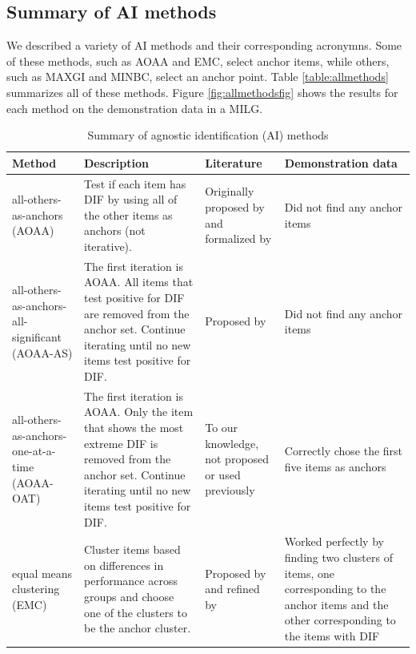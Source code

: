 \documentclass[
  11pt,
]{article}
\begin{document}
\hypertarget{summary-of-ai-methods}{%
\subsection{Summary of AI methods}\label{summary-of-ai-methods}}

We described a variety of AI methods and their corresponding acronymns. Some of these methods, such as AOAA and EMC, select anchor items, while others, such as MAXGI and MINBC, select an anchor point. Table \ref{table:allmethods} summarizes all of these methods. Figure \ref{fig:allmethodsfig} shows the results for each method on the demonstration data in a MILG.

\begin{table}[H]
\caption{Summary of agnostic identification (AI) methods}
\centering
\begin{tabular}{|p{3cm}|p{4cm}|p{3cm}|p{3cm}|}
\toprule

Method & Description & Literature & Demonstration data \\

\midrule

all-others-as-anchors (AOAA) & Test if each item has DIF by using all of the other items as anchors (not iterative). & Originally proposed by \cite{lord1980} and formalized by \cite{thissen1993detection} & Did not find any anchor items \\\hline

all-others-as-anchors-all-significant (AOAA-AS) & The first iteration is AOAA. All items that test positive for DIF are removed from the anchor set. Continue iterating until no new items test positive for DIF. & Proposed by \cite{drasgow1987study} & Did not find any anchor items \\\hline

all-others-as-anchors-one-at-a-time (AOAA-OAT) & The first iteration is AOAA. Only the item that shows the most extreme DIF is removed from the anchor set. Continue iterating until no new items test positive for DIF. & To our knowledge, not proposed or used previously & Correctly chose the first five items as anchors \\\hline

equal means clustering (EMC) & Cluster items based on differences in performance across groups and choose one of the clusters to be the anchor cluster. & Proposed by \cite{bechger2015statistical} and refined by \cite{pohl2017cluster} & Worked perfectly by finding two clusters of items, one corresponding to the anchor items and the other corresponding to the items with DIF \\\hline


\end{tabular}
\end{table}
\end{document}
